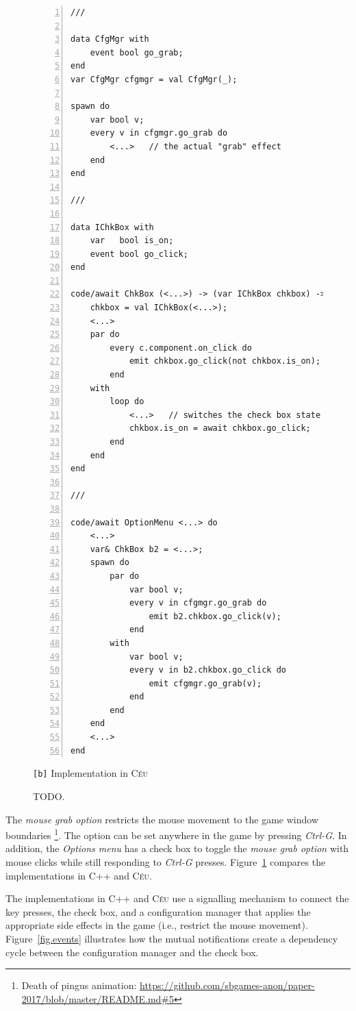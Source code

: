\documentclass{vgtc}                          %
\newcommand{\CEU}{\textsc{C\'{e}u}\xspace}
\newcommand{\code}[1] {{\small{\texttt{#1}}}}
\newcommand{\bx}{\code{[b]}\xspace}
\begin{document}
\begin{figure}[t]
\begin{minipage}[t]{0.50\linewidth}
\begin{lstlisting}[numbers=left,xleftmargin=3em]
///

data CfgMgr with
    event bool go_grab;
end
var CfgMgr cfgmgr = val CfgMgr(_);

spawn do
    var bool v;
    every v in cfgmgr.go_grab do
        <...>   // the actual "grab" effect
    end
end

///

data IChkBox with
    var   bool is_on;
    event bool go_click;
end

code/await ChkBox (<...>) -> (var IChkBox chkbox) -> FOREVER do
    chkbox = val IChkBox(<...>);
    <...>
    par do
        every c.component.on_click do
            emit chkbox.go_click(not chkbox.is_on);
        end
    with
        loop do
            <...>   // switches the check box state
            chkbox.is_on = await chkbox.go_click;
        end
    end
end

///

code/await OptionMenu <...> do
    <...>
    var& ChkBox b2 = <...>;
    spawn do
        par do
            var bool v;
            every v in cfgmgr.go_grab do
                emit b2.chkbox.go_click(v);
            end
        with
            var bool v;
            every v in b2.chkbox.go_click do
                emit cfgmgr.go_grab(v);
            end
        end
    end
    <...>
end

\end{lstlisting}
\centering\small{\bx Implementation in \CEU}
\end{minipage}
\caption{ TODO.
\label{lst.grab}
}
\end{figure}

The \emph{mouse grab option} restricts the mouse movement to the game window
boundaries%
\footnote{Death of pingus animation: \url{https://github.com/sbgames-anon/paper-2017/blob/master/README.md#5} }.
The option can be set anywhere in the game by pressing \emph{Ctrl-G}.
In addition, the \emph{Options menu} has a check box to toggle the
\emph{mouse grab option} with mouse clicks while still responding to
\emph{Ctrl-G} presses.
%
Figure~\ref{lst.grab} compares the implementations in C++ and \CEU.

The implementations in C++ and \CEU use a signalling mechanism to connect the
key presses, the check box, and a configuration manager that applies the
appropriate side effects in the game (i.e., restrict the mouse movement).
Figure~\ref{fig.events} illustrates how the mutual notifications create a 
dependency cycle between the configuration manager and the check box.
\end{document}

